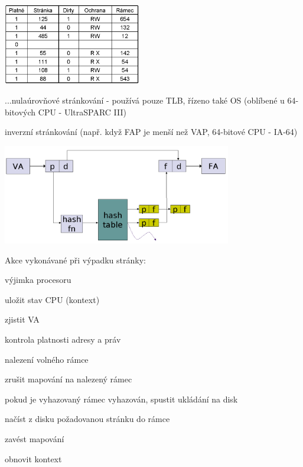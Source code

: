 \begin{pitemize}
		\par \begin{center} \includegraphics[width=6cm]{informatika/operacne_systemy_a_hw/obrazky/strankovani-tlb.png} \end{center} 
		\par ...nulaúrovňové stránkování - používá pouze TLB, řízeno také OS (oblíbené u 64-bitových CPU - UltraSPARC III)
	\item inverzní stránkování (např. když FAP je menší než VAP, 64-bitové CPU - IA-64)
		\par \begin{center} \includegraphics[width=10cm]{informatika/operacne_systemy_a_hw/obrazky/strankovani-inv.png} \end{center} 
\end{pitemize}

Akce vykonávané při výpadku stránky:
\begin{pitemize}
	\item výjimka procesoru
	\item uložit stav CPU (kontext)
	\item zjistit VA
	\item kontrola platnosti adresy a práv
	\item nalezení volného rámce
	\item zrušit mapování na nalezený rámec
	\item pokud je vyhazovaný rámec vyhazován, spustit ukládání na disk
	\item načíst z disku požadovanou stránku do rámce
	\item zavést mapování
	\item obnovit kontext
\end{pitemize}


